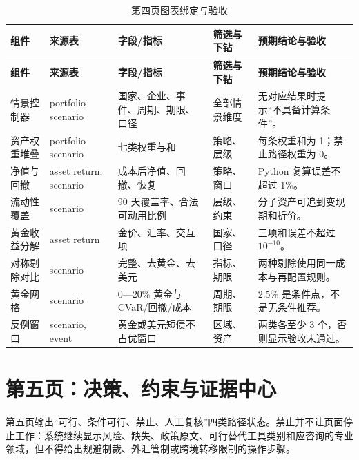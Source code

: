 \documentclass[UTF8,fontset=windows,12pt,openany]{ctexbook}
\begin{document}
\clearpage
\begin{landscape}
\begin{longtable}{p{3.3cm}p{3.6cm}p{4.5cm}p{3.0cm}p{4.5cm}}
\caption{第四页图表绑定与验收}\label{tab:page4-map}\\
\toprule
\textbf{组件} & \textbf{来源表} & \textbf{字段/指标} & \textbf{筛选与下钻} & \textbf{预期结论与验收}\\
\midrule
\endfirsthead
\toprule \textbf{组件} & \textbf{来源表} & \textbf{字段/指标} & \textbf{筛选与下钻} & \textbf{预期结论与验收}\\ \midrule
\endhead
情景控制器 & portfolio scenario & 国家、企业、事件、周期、期限、口径 & 全部情景维度 & 无对应结果时提示“不具备计算条件”。\\
资产权重堆叠 & portfolio scenario & 七类权重与和 & 策略、层级 & 每条权重和为 1；禁止路径权重为 0。\\
净值与回撤 & asset return, scenario & 成本后净值、回撤、恢复 & 策略、窗口 & Python 复算误差不超过 1\%。\\
流动性覆盖 & scenario & 90 天覆盖率、合法可动用比例 & 层级、约束 & 分子资产可追到变现期和折价。\\
黄金收益分解 & asset return & 金价、汇率、交互项 & 国家、口径 & 三项和误差不超过 \(10^{-10}\)。\\
对称剔除对比 & scenario & 完整、去黄金、去美元 & 指标、期限 & 两种剔除使用同一成本与再配置规则。\\
黄金网格 & scenario & 0—20\% 黄金与 CVaR/回撤/成本 & 周期、期限 & 2.5\% 是条件点，不是无条件推荐。\\
反例窗口 & scenario, event & 黄金或美元短债不占优窗口 & 区域、资产 & 两类各至少 3 个，否则显示验收未通过。\\
\bottomrule
\end{longtable}
\end{landscape}

\chapter{第五页：决策、约束与证据中心}

第五页输出“可行、条件可行、禁止、人工复核”四类路径状态。禁止并不让页面停止工作：系统继续显示风险、缺失、政策原文、可行替代工具类别和应咨询的专业领域，但不得给出规避制裁、外汇管制或跨境转移限制的操作步骤。
\end{document}
